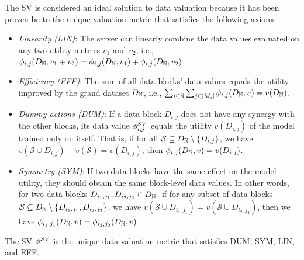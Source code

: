 The SV is considered an ideal solution to data valuation because it has been proven be to the unique valuation metric that satisfies the following axioms~\citep{shapley1953value}.
\begin{itemize}[leftmargin=*]
    \item \textit{Linearity (LIN)}: The server can linearly combine the data values evaluated on any two utility metrics $v_1$ and $v_2$, i.e., $\phi_{i,j}(\granddataset, v_1+v_2) = \phi_{i,j}(\granddataset, v_1)  + \phi_{i,j}(\granddataset, v_2)$.
    \item \textit{Efficiency (EFF)}: The sum of all data blocks' data values equals the utility improved by the grand dataset $\granddataset$, i.e., $\sum_{i\in \clientset} \sum_{j\in[M_i]} \phi_{i,j}(\granddataset, v) = v(\granddataset)$.
    \item \textit{Dummy actions (DUM)}: If a data block $D_{i,j}$ does not have any synergy with the other blocks, its data value $\sv_{i,j}$ equals the utility $v(D_{i,j})$ of the model trained only on itself.
    That is, if for all $\mathcal{S}\subseteq \granddataset \setminus \set[D_{i,j}]$, we have $v(\mathcal{S}\cup D_{i, j}) - v(\mathcal{S}) = v(D_{i, j})$, then $\phi_{i,j}(\granddataset, v) = v(D_{i,j})$.
    \item \textit{Symmetry (SYM)}: If two data blocks have the same effect on the model utility, they should obtain the same block-level data values.
    In other words, for two data blocks $D_{i_1,j_1}, D_{i_2,j_2} \in \granddataset$, if for any subset of data blocks $\mathcal{S} \subseteq \granddataset \setminus \set[D_{i_1,j_1}, D_{i_2,j_2}]$, we have $v(\mathcal{S} \cup D_{i_1,j_1}) = v(\mathcal{S} \cup D_{i_2,j_2})$, then we have $\phi_{i_1,j_1}(\granddataset, v) =\phi_{i_2, j_2}(\granddataset, v)$.
\end{itemize}


\begin{theorem}
\label{thm:sv_unique}
    The SV $\sv$ is the unique data valuation metric that satisfies DUM, SYM, LIN, and EFF.
\end{theorem}



